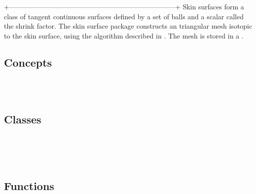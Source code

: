

%
+------------------------------------------------------------------------+
Skin surfaces form a class of tangent continuous surfaces defined by a
set of balls and a scalar called the shrink factor. The skin surface
package constructs an triangular mesh isotopic to the skin surface,
using the algorithm described in \cite{cgal:kv-mssct-05}. The mesh is
stored in a .

\subsection*{Concepts}
\\
\\



\subsection*{Classes}
\\
\\

\\

\subsection*{Functions}
\\
\\


